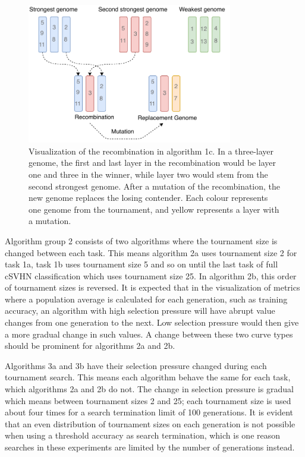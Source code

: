 \begin{figure}[ht]
    \centering
    \includegraphics[width=0.8\textwidth]{Chapters/4.Experiments/exp2/figures/Recombination_algorithm.pdf}
    \caption[Recombination algorithm]{Visualization of the recombination in algorithm 1c. In a three-layer genome, the first and last layer in the recombination would be layer one and three in the winner, while layer two would stem from the second strongest genome. After a mutation of the recombination, the new genome replaces the losing contender. Each colour represents one genome from the tournament, and yellow represents a layer with a mutation.}
    \label{fig:search.recombination_algorithm}
\end{figure}

Algorithm group 2 consists of two algorithms where the tournament size is changed between each task. This means algorithm 2a uses tournament size 2 for task 1a, task 1b uses tournament size 5 and so on until the last task of full cSVHN classification which uses tournament size 25. In algorithm 2b, this order of tournament sizes is reversed. It is expected that in the visualization of metrics where a population average is calculated for each generation, such as training accuracy, an algorithm with high selection pressure will have abrupt value changes from one generation to the next. Low selection pressure would then give a more gradual change in such values. A change between these two curve types should be prominent for algorithms 2a and 2b.

Algorithms 3a and 3b have their selection pressure changed during each tournament search. This means each algorithm behave the same for each task, which algorithms 2a and 2b do not. The change in selection pressure is gradual which means between tournament sizes 2 and 25; each tournament size is used about four times for a search termination limit of 100 generations. It is evident that an even distribution of tournament sizes on each generation is not possible when using a threshold accuracy as search termination, which is one reason searches in these experiments are limited by the number of generations instead. 

